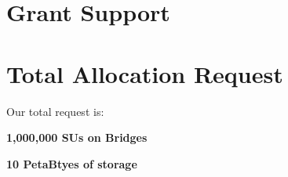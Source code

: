 \documentclass[12pt]{article}
\begin{document}
\begin{small}
\section{Grant Support}

\section{Total Allocation Request}

Our total request is:

{\bf 1,000,000 SUs on Bridges}

{\bf 10 PetaBtyes of storage}

\end{small}




\end{document}
